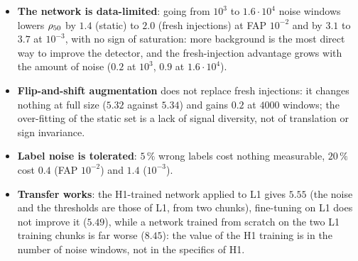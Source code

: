 \begin{itemize}[nosep]
\item \textbf{The network is data-limited}: going from $10^3$ to $1.6\cdot10^4$ noise windows lowers $\rho_{50}$ by $1.4$ (static) to $2.0$ (fresh injections) at FAP $10^{-2}$ and by $3.1$ to $3.7$ at $10^{-3}$, with no sign of saturation: more background is the most direct way to improve the detector, and the fresh-injection advantage grows with the amount of noise ($0.2$ at $10^3$, $0.9$ at $1.6\cdot10^4$).
\item \textbf{Flip-and-shift augmentation} does not replace fresh injections: it changes nothing at full size ($5.32$ against $5.34$) and gains $0.2$ at $4000$ windows; the over-fitting of the static set is a lack of signal diversity, not of translation or sign invariance.
\item \textbf{Label noise is tolerated}: $5\,\%$ wrong labels cost nothing measurable, $20\,\%$ cost $0.4$ (FAP $10^{-2}$) and $1.4$ ($10^{-3}$).
\item \textbf{Transfer works}: the H1-trained network applied to L1 gives $5.55$ (the noise and the thresholds are those of L1, from two chunks), fine-tuning on L1 does not improve it ($5.49$), while a network trained from scratch on the two L1 training chunks is far worse ($8.45$): the value of the H1 training is in the number of noise windows, not in the specifics of H1.
\end{itemize}

